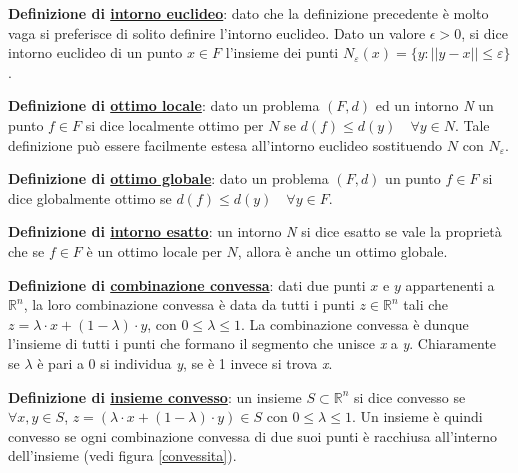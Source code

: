 \documentclass[11pt, oneside]{book}
\begin{document}
\par\bigskip

{\bf Definizione di \underline{intorno euclideo}}: dato che la
definizione precedente \`e molto vaga si preferisce di solito definire
l'intorno euclideo. Dato un valore $\epsilon > 0$, si dice intorno
euclideo di un punto $x \in F$ l'insieme dei punti $N_{\varepsilon}(x)
= \{y : ||y-x|| \leq \varepsilon \}$.

\par\bigskip

{\bf Definizione di \underline{ottimo locale}}: dato un problema
$(F,d)$ ed un intorno {\em N} un punto $f \in F$ si dice localmente
ottimo per $N$ se $d(f) \leq d(y) \quad \forall y \in N$. Tale
definizione pu\`o essere facilmente estesa all'intorno euclideo
sostituendo $N$ con $N_\varepsilon$.

\par\bigskip

{\bf Definizione di \underline{ottimo globale}}: dato un problema
$(F,d)$ un punto $f \in F$ si dice globalmente ottimo se $d(f) \leq
d(y) \quad \forall y \in F$. 

\par\bigskip

{\bf Definizione di \underline{intorno esatto}}: un intorno {\em N} si
dice esatto se vale la propriet\`a che se $f \in F$ \`e un ottimo
locale per $N$, allora \`e anche un ottimo globale.

\par\bigskip

{\bf Definizione di \underline{combinazione convessa}}: dati due punti
$x$ e $y$ appartenenti a $\mathbb{R}^n$, la loro combinazione convessa
\`e data da tutti i punti $z \in \mathbb{R}^n$ tali che $z = \lambda
\cdot x + (1-\lambda)\cdot y$, con $0 \leq \lambda \leq 1$. La
combinazione convessa \`e dunque l'insieme di tutti i punti che
formano il segmento che unisce {\em x} a {\em y}. Chiaramente se
$\lambda$ \`e pari a 0 si individua {\em y}, se \`e 1 invece si trova
{\em x}.

\par\bigskip

{\bf Definizione di \underline{insieme convesso}}: un insieme $S
\subset \mathbb{R}^n$ si dice convesso se $\forall x, y \in S$, $z =
(\lambda\cdot x + (1-\lambda)\cdot y) \in S$ con $0 \leq \lambda \leq
1$. Un insieme \`e quindi convesso se ogni combinazione convessa di
due suoi punti \`e racchiusa all'interno dell'insieme (vedi figura
\ref{convessita}).
\end{document}
